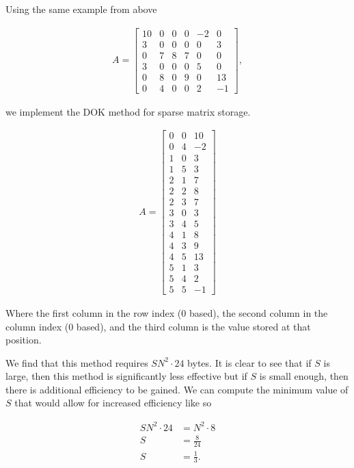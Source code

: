 \documentclass[../fem.tex]{subfile}
\begin{document}
Using the same example from above

\begin{align*}
  A = \begin{bmatrix}
    10 & 0 & 0 & 0 & -2 & 0 \\
    3 & 0 & 0 & 0 & 0 & 3 \\
    0 & 7 & 8 & 7 & 0 & 0 \\
    3 & 0 & 0 & 0 & 5 & 0 \\
    0 & 8 & 0 & 9 & 0 & 13 \\
    0 & 4 & 0 & 0 & 2 & -1
  \end{bmatrix},
\end{align*}

we implement the DOK method for sparse matrix storage.

\begin{align*}
  A = \begin{bmatrix}
    0 & 0 & 10 \\
    0 & 4 & -2 \\
    1 & 0 & 3 \\
    1 & 5 & 3 \\
    2 & 1 & 7 \\
    2 & 2 & 8 \\
    2 & 3 & 7 \\
    3 & 0 & 3 \\
    3 & 4 & 5 \\
    4 & 1 & 8 \\
    4 & 3 & 9 \\
    4 & 5 & 13 \\
    5 & 1 & 3 \\
    5 & 4 & 2 \\
    5 & 5 & -1
  \end{bmatrix}
\end{align*}

Where the first column in the row index ($0$ based), the second column in the
column index ($0$ based), and the third column is the value stored at that
position.

We find that this method requires $SN^2\cdot24$ bytes. It is clear to see that
if $S$ is large, then this method is significantly less effective but if $S$ is
small enough, then there is additional efficiency to be gained. We can compute
the minimum value of $S$ that would allow for increased efficiency like so

\begin{align*}
  SN^2\cdot24&=N^2\cdot8\\
  S&=\frac{8}{24}\\
  S&=\frac{1}{3}.
\end{align*}
\end{document}
